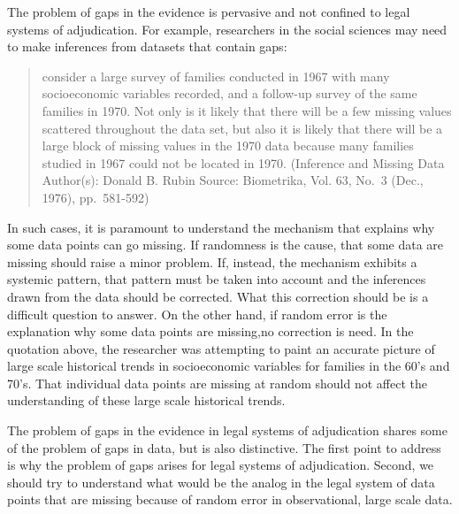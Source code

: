 \documentclass[
  10pt,
  dvipsnames,enabledeprecatedfontcommands]{scrartcl}
\begin{document}
The problem of gaps in the evidence is pervasive and not confined to
legal systems of adjudication. For example, researchers in the social
sciences may need to make inferences from datasets that contain gaps:

\begin{quote}
consider a large survey of families conducted in 1967 with many
socioeconomic variables recorded, and a follow-up survey of the same
families in 1970. Not only is it likely that there will be a few missing
values scattered throughout the data set, but also it is likely that
there will be a large block of missing values in the 1970 data because
many families studied in 1967 could not be located in 1970. (Inference
and Missing Data Author(s): Donald B. Rubin Source: Biometrika, Vol. 63,
No.~3 (Dec., 1976), pp.~581-592)
\end{quote}

In such cases, it is paramount to understand the mechanism that explains
why some data points can go missing. If randomness is the cause, that
some data are missing should raise a minor problem. If, instead, the
mechanism exhibits a systemic pattern, that pattern must be taken into
account and the inferences drawn from the data should be corrected. What
this correction should be is a difficult question to answer. On the
other hand, if random error is the explanation why some data points are
missing,no correction is need. In the quotation above, the researcher
was attempting to paint an accurate picture of large scale historical
trends in socioeconomic variables for families in the 60's and 70's.
That individual data points are missing at random should not affect the
understanding of these large scale historical trends.

The problem of gaps in the evidence in legal systems of adjudication
shares some of the problem of gaps in data, but is also distinctive. The
first point to address is why the problem of gaps arises for legal
systems of adjudication. Second, we should try to understand what would
be the analog in the legal system of data points that are missing
because of random error in observational, large scale data.
\end{document}
